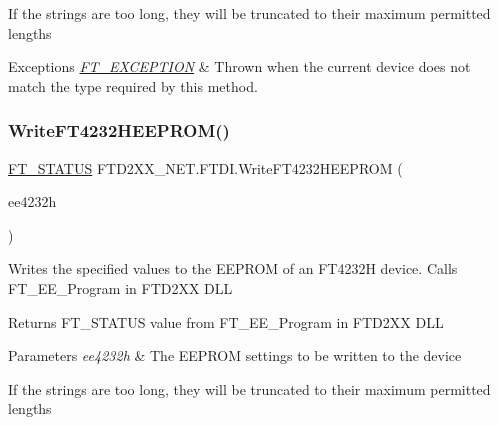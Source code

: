 If the strings are too long, they will be truncated to their maximum permitted lengths


\begin{DoxyExceptions}{Exceptions}
{\em \mbox{\hyperlink{class_f_t_d2_x_x___n_e_t_1_1_f_t_d_i_1_1_f_t___e_x_c_e_p_t_i_o_n}{F\+T\+\_\+\+E\+X\+C\+E\+P\+T\+I\+ON}}} & Thrown when the current device does not match the type required by this method.\\
\hline
\end{DoxyExceptions}
\mbox{\label{class_f_t_d2_x_x___n_e_t_1_1_f_t_d_i_a8b0ada92a4346617532634f56298349c}} 
\subsubsection{\texorpdfstring{WriteFT4232HEEPROM()}{WriteFT4232HEEPROM()}}
{\footnotesize\ttfamily \mbox{\hyperlink{class_f_t_d2_x_x___n_e_t_1_1_f_t_d_i_aabe20ad905cc4ccc1e35dd5b877d9a83}{F\+T\+\_\+\+S\+T\+A\+T\+US}} F\+T\+D2\+X\+X\+\_\+\+N\+E\+T.\+F\+T\+D\+I.\+Write\+F\+T4232\+H\+E\+E\+P\+R\+OM (\begin{DoxyParamCaption}\item[{\mbox{\hyperlink{class_f_t_d2_x_x___n_e_t_1_1_f_t_d_i_1_1_f_t4232_h___e_e_p_r_o_m___s_t_r_u_c_t_u_r_e}{F\+T4232\+H\+\_\+\+E\+E\+P\+R\+O\+M\+\_\+\+S\+T\+R\+U\+C\+T\+U\+RE}}}]{ee4232h }\end{DoxyParamCaption})}



Writes the specified values to the E\+E\+P\+R\+OM of an F\+T4232H device. Calls F\+T\+\_\+\+E\+E\+\_\+\+Program in F\+T\+D2\+XX D\+LL 

\begin{DoxyReturn}{Returns}
F\+T\+\_\+\+S\+T\+A\+T\+US value from F\+T\+\_\+\+E\+E\+\_\+\+Program in F\+T\+D2\+XX D\+LL
\end{DoxyReturn}

\begin{DoxyParams}{Parameters}
{\em ee4232h} & The E\+E\+P\+R\+OM settings to be written to the device\\
\hline
\end{DoxyParams}


If the strings are too long, they will be truncated to their maximum permitted lengths


